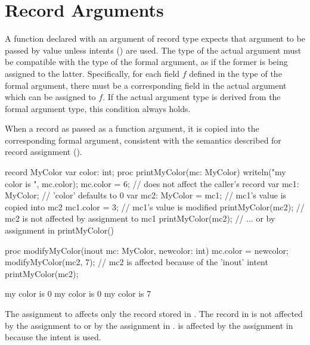 \section{Record Arguments}
\label{Record_Arguments}

A function declared with an argument of record type expects that argument to be
passed by value unless intents () are used.  The type of the
actual argument must be compatible with the type of the formal argument, as if
the former is being assigned to the latter.  Specifically, for each field $f$
defined in the type of the formal argument, there must be a corresponding field
in the actual argument which can be assigned to $f$.  If the actual argument
type is derived from the formal argument type, this condition always holds.

When a record as passed as a function argument, it is copied into
the corresponding formal argument, consistent with the semantics described for
record assignment ().

\begin{example}
\begin{chapelpre}
\end{chapelpre}
\begin{chapel}
record MyColor {
  var color: int;
}
proc printMyColor(mc: MyColor) {
  writeln("my color is ", mc.color);
  mc.color = 6;   // does not affect the caller's record
}
var mc1: MyColor;        // 'color' defaults to 0
var mc2: MyColor = mc1;  // mc1's value is copied into mc2
mc1.color = 3;           // mc1's value is modified
printMyColor(mc2);       // mc2 is not affected by assignment to mc1
printMyColor(mc2);       // ... or by assignment in printMyColor()

proc modifyMyColor(inout mc: MyColor, newcolor: int) {
  mc.color = newcolor;
}
modifyMyColor(mc2, 7);   // mc2 is affected because of the 'inout' intent
printMyColor(mc2);
\end{chapel}
\begin{chapeloutput}
my color is 0
my color is 0
my color is 7
\end{chapeloutput}
The assignment to  affects only the record stored
in . The record in  is not affected by
the assignment to  or by the assignment in .
 is affected by the assignment in 
because the intent  is used.
\end{example}

